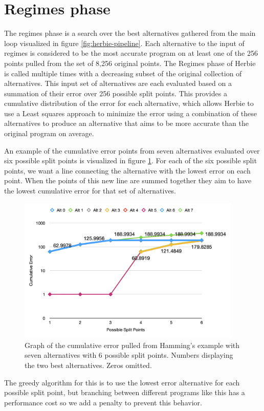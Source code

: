 \documentclass{article}
\begin{document}
\section{Regimes phase}
The regimes phase is a search over the best alternatives gathered from the main loop visualized in figure \ref{fig:herbie-pipeline}.  Each alternative to the input of regimes is considered to be the most accurate program on at least one of the 256 points pulled from the set of 8,256 original points. The Regimes phase of Herbie is called multiple times with a decreasing subset of the original collection of alternatives. This input set of alternatives are each evaluated based on a summation of their error over 256 possible split points. This provides a cumulative distribution of the error for each alternative, which allows Herbie to use a Least squares approach to minimize the error using a combination of these alternatives to produce an alternative that aims to be more accurate than the original program on average. 

An example of the cumulative error points from seven alternatives evaluated over six possible split points is visualized in figure \ref{fig:cumulative-error}. For each of the six possible split points, we want a line connecting the alternative with the lowest error on each point. When the points of this new line are summed together they aim to have the lowest cumulative error for that set of alternatives.

\begin{figure}[htbp]
\begin{center}
\includegraphics[width=0.95\textwidth]{cumulative-error-graph.png}
\caption{Graph of the cumulative error pulled from Hamming's example with seven alternatives with 6 possible split points. Numbers displaying the two best alternatives. Zeros omitted.}
\label{fig:cumulative-error} 
\end{center}
\end{figure}
The greedy algorithm for this is to use the lowest error alternative for each possible split point, but branching between different programs like this has a performance cost so we add a penalty to prevent this behavior. 
\end{document}
